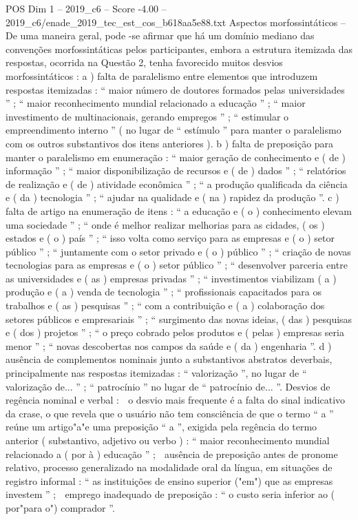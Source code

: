 \begin{textsample}{POS Dim 1 – 2019\_c6 – Score -4.00 – 2019\_c6/enade\_2019\_tec\_est\_cos\_b618aa5e88.txt}
Aspectos morfossintáticos – De uma maneira geral, pode -se afirmar que há um domínio mediano das convenções morfossintáticas pelos participantes, embora a estrutura itemizada das respostas, ocorrida na Questão 2, tenha favorecido muitos desvios morfossintáticos : a ) falta de paralelismo entre elementos que introduzem respostas itemizadas : “ maior número de doutores formados pelas universidades ” ; “ maior reconhecimento mundial relacionado a educação ” ; “ maior investimento de multinacionais, gerando empregos ” ; “ estimular o empreendimento interno ” ( no lugar de “ estímulo ” para manter o paralelismo com os outros substantivos dos itens anteriores ). b ) falta de preposição para manter o paralelismo em enumeração : “ maior geração de conhecimento e ( de ) informação ” ; “ maior disponibilização de recursos e ( de ) dados ” ; “ relatórios de realização e ( de ) atividade econômica ” ; “ a produção qualificada da ciência e ( da ) tecnologia ” ; “ ajudar na qualidade e ( na ) rapidez da produção ”. c ) falta de artigo na enumeração de itens : “ a educação e ( o ) conhecimento elevam uma sociedade ” ; “ onde é melhor realizar melhorias para as cidades, ( os ) estados e ( o ) país ” ; “ isso volta como serviço para as empresas e ( o ) setor público ” ; “ juntamente com o setor privado e ( o ) público ” ; “ criação de novas tecnologias para as empresas e ( o ) setor público ” ; “ desenvolver parceria entre as universidades e ( as ) empresas privadas ” ; “ investimentos viabilizam ( a ) produção e ( a ) venda de tecnologia ” ; “ profissionais capacitados para os trabalhos e ( as ) pesquisas ” ; “ com a contribuição e ( a ) colaboração dos setores públicos e empresariais ” ; “ surgimento das novas ideias, ( das ) pesquisas e ( dos ) projetos ” ; “ o preço cobrado pelos produtos e ( pelas ) empresas seria menor ” ; “ novas descobertas nos campos da saúde e ( da ) engenharia ”. d ) ausência de complementos nominais junto a substantivos abstratos deverbais, principalmente nas respostas itemizadas : “ valorização ”, no lugar de “ valorização de... ” ; “ patrocínio ” no lugar de “ patrocínio de... ”.
Desvios de regência nominal e verbal :  o desvio mais frequente é a falta do sinal indicativo da crase, o que revela que o usuário não tem consciência de que o termo “ a ” reúne um artigo"a"e uma preposição “ a ”, exigida pela regência do termo anterior ( substantivo, adjetivo ou verbo ) : “ maior reconhecimento mundial relacionado a ( por à ) educação ” ;  ausência de preposição antes de pronome relativo, processo generalizado na modalidade oral da língua, em situações de registro informal : “ as instituições de ensino superior ("em") que as empresas investem ” ;  emprego inadequado de preposição : “ o custo seria inferior ao ( por"para o") comprador ”.

\end{textsample}
